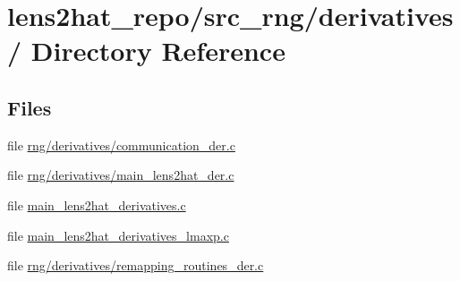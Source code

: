 \section{lens2hat\-\_\-repo/src\-\_\-rng/derivatives/ Directory Reference}
\label{dir_07c718bbf579f325adf09849b69d463f}
\subsection*{Files}
\begin{DoxyCompactItemize}
\item 
file \hyperlink{rng_2derivatives_2communication__der_8c}{rng/derivatives/communication\-\_\-der.\-c}
\item 
file \hyperlink{rng_2derivatives_2main__lens2hat__der_8c}{rng/derivatives/main\-\_\-lens2hat\-\_\-der.\-c}
\item 
file \hyperlink{main__lens2hat__derivatives_8c}{main\-\_\-lens2hat\-\_\-derivatives.\-c}
\item 
file \hyperlink{main__lens2hat__derivatives__lmaxp_8c}{main\-\_\-lens2hat\-\_\-derivatives\-\_\-lmaxp.\-c}
\item 
file \hyperlink{rng_2derivatives_2remapping__routines__der_8c}{rng/derivatives/remapping\-\_\-routines\-\_\-der.\-c}
\end{DoxyCompactItemize}
